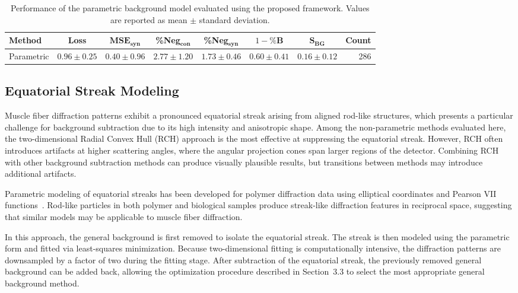 \documentclass[iucr,review]{iucrjournals}
\begin{document}
\begin{table}[t]
\caption{Performance of the parametric background model evaluated using the proposed framework.
Values are reported as mean $\pm$ standard deviation.}
\label{tab:param_performance}
\centering
\small
\setlength{\tabcolsep}{4pt}
\renewcommand{\arraystretch}{1.05}
\begin{tabular}{@{}lccccccr@{}}
\toprule
\textbf{Method} & Loss & $\mathbf{MSE}_{\mathbf{syn}}$ & \textbf{\%Neg$_{\mathbf{con}}$} &
\textbf{\%Neg$_{\mathbf{syn}}$} & \textbf{$1-\%\mathbf{B}$} &
\textbf{$\mathbf{S}_{\mathbf{BG}}$} & Count \\ \midrule
Parametric & $0.96 \pm 0.25$ & $0.40 \pm 0.96$ & $2.77 \pm 1.20$ &
$1.73 \pm 0.46$ & $0.60 \pm 0.41$ & $0.16 \pm 0.12$ & 286 \\
\bottomrule
\end{tabular}
\end{table}


\subsection{Equatorial Streak Modeling}

Muscle fiber diffraction patterns exhibit a pronounced equatorial streak arising from aligned rod-like structures, which presents a particular challenge for background subtraction due to its high intensity and anisotropic shape. Among the non-parametric methods evaluated here, the two-dimensional Radial Convex Hull (RCH) approach is the most effective at suppressing the equatorial streak. However, RCH often introduces artifacts at higher scattering angles, where the angular projection cones span larger regions of the detector. Combining RCH with other background subtraction methods can produce visually plausible results, but transitions between methods may introduce additional artifacts.

Parametric modeling of equatorial streaks has been developed for polymer diffraction data using elliptical coordinates and Pearson VII functions~\cite{MurthyZeroGrubb1997}. Rod-like particles in both polymer and biological samples produce streak-like diffraction features in reciprocal space, suggesting that similar models may be applicable to muscle fiber diffraction.

In this approach, the general background is first removed to isolate the equatorial streak. The streak is then modeled using the parametric form and fitted via least-squares minimization. Because two-dimensional fitting is computationally intensive, the diffraction patterns are downsampled by a factor of two during the fitting stage. After subtraction of the equatorial streak, the previously removed general background can be added back, allowing the optimization procedure described in Section~3.3 to select the most appropriate general background method.
\end{document}
